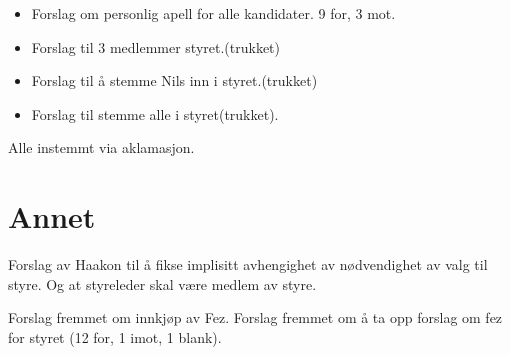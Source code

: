 \documentclass{article}
\begin{document}
\begin{itemize}
  \item Forslag om personlig apell for alle kandidater. 9 for, 3 mot.
  \item Forslag til 3 medlemmer styret.(trukket)
  \item Forslag til å stemme Nils inn i styret.(trukket)
  \item Forslag til stemme alle i styret(trukket).
\end{itemize}

Alle instemmt via aklamasjon.

\section*{Annet}

Forslag av Haakon til å fikse implisitt avhengighet av
nødvendighet av valg til styre. Og at styreleder skal være
medlem av styre.

Forslag fremmet om innkjøp av Fez. Forslag fremmet om å ta opp
forslag om fez for styret (12 for, 1 imot, 1 blank).
\end{document}
